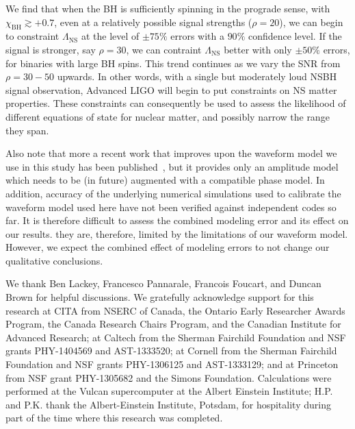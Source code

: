 \documentclass[aps,prd,amsmath,floats,floatfix, twocolumn,
superscriptaddress,nofootinbib,showpacs]{revtex4-1}
\newcommand{\prayush}{\textcolor{red!40!black}}
\newcommand{\lambdans}{\Lambda_\mathrm{NS}}
\newcommand{\chibh}{\chi_\mathrm{BH}}
\begin{document}
\prayush{%
We find that when the BH is sufficiently spinning in the prograde sense,
with $\chibh\gtrsim +0.7$, even at a relatively possible signal strengths ($\rho=20$),
we can begin to constraint $\lambdans$ at the level of $\pm 75\%$ errors with a $90\%$
confidence level. If the signal is stronger, say $\rho=30$, we can contraint
$\lambdans$ better with only $\pm 50\%$ errors, for binaries with large BH spins.
This trend continues as we vary the SNR from $\rho=30-50$ upwards. In other words,
with a single but moderately loud NSBH signal observation, Advanced LIGO will begin
to put constraints on NS matter properties. These constraints can consequently
be used to assess the likelihood of different equations of state for nuclear
matter, and possibly narrow the range they span.
}


\prayush{
Also note
that more a recent work that improves upon the waveform model we use in this
study has been published~\cite{Pannarale:2015jka}, but it provides only an 
amplitude model which needs to be (in future) augmented with a compatible
phase model. In addition, accuracy of the underlying numerical simulations 
used to calibrate the waveform model used here have not been verified against 
independent codes so far.
It is therefore difficult to assess the combined modeling error and its effect
on our results. they are, therefore, limited by the limitations of our
waveform model. However, we expect the combined effect of modeling errors to
not change our qualitative conclusions.
}


\begin{acknowledgments}
We thank Ben Lackey, Francesco Pannarale, Francois Foucart, and Duncan Brown
    for helpful discussions. We gratefully acknowledge support
  for this research at CITA from NSERC of Canada, the Ontario Early 
  Researcher Awards Program, the Canada Research
  Chairs Program, and the Canadian Institute for Advanced Research; at
  Caltech from the Sherman Fairchild Foundation and NSF grants
  PHY-1404569 and AST-1333520; at Cornell from the
  Sherman Fairchild Foundation and NSF grants PHY-1306125 and
  AST-1333129; and at Princeton from NSF grant PHY-1305682 and the
  Simons Foundation.  Calculations were performed at the Vulcan
  supercomputer at the Albert Einstein Institute;
  H.P. and P.K. thank the Albert-Einstein Institute,
  Potsdam, for hospitality during part of the time where this research
  was completed.
\end{acknowledgments}
\end{document}
